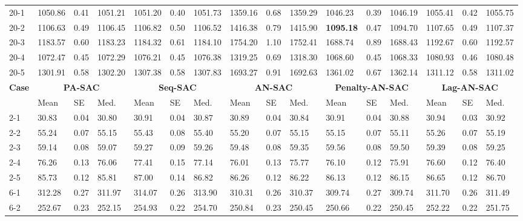 \begin{table}[!htbp]
{\begin{tabular}{l *{5}{lll}}
20-1 & 1050.86 & 0.41 & 1051.21 & 1051.20 & 0.40 & 1051.73 & 1359.16 & 0.68 & 1359.29 & 1046.23 & 0.39 & 1046.19 & 1055.41 & 0.42 & 1055.75 \\
20-2 & 1106.63 & 0.49 & 1106.45 & 1106.82 & 0.50 & 1106.52 & 1416.38 & 0.79 & 1415.90 & \textbf{1095.18} & 0.47 & 1094.70 & 1107.65 & 0.49 & 1107.37 \\
20-3 & 1183.57 & 0.60 & 1183.23 & 1184.32 & 0.61 & 1184.10 & 1754.20 & 1.10 & 1752.41 & 1688.74 & 0.89 & 1688.43 & 1192.67 & 0.60 & 1192.57 \\
20-4 & 1072.47 & 0.45 & 1072.29 & 1076.21 & 0.45 & 1076.38 & 1319.25 & 0.69 & 1318.30 & 1068.60 & 0.45 & 1068.33 & 1080.93 & 0.46 & 1080.48 \\
20-5 & 1301.91 & 0.58 & 1302.20 & 1307.38 & 0.58 & 1307.83 & 1693.27 & 0.91 & 1692.63 & 1361.02 & 0.67 & 1362.14 & 1311.12 & 0.58 & 1311.02 \\
\midrule
\multirow{2}{*}{\textbf{Case}}
& \multicolumn{3}{c}{\textbf{PA-SAC}}
& \multicolumn{3}{c}{\textbf{Seq-SAC}}
& \multicolumn{3}{c}{\textbf{AN-SAC}}
& \multicolumn{3}{c}{\textbf{Penalty-AN-SAC}}
& \multicolumn{3}{c}{\textbf{Lag-AN-SAC}}
\\
\cmidrule(lr){2-4}\cmidrule(lr){5-7}\cmidrule(lr){8-10}\cmidrule(lr){11-13}\cmidrule(lr){14-16}
 & Mean & SE & Med. & Mean & SE & Med. & Mean & SE & Med. & Mean & SE & Med. & Mean & SE & Med.\\
\midrule
2-1 & 30.83 & 0.04 & 30.80 & 30.91 & 0.04 & 30.87 & 30.89 & 0.04 & 30.84 & 30.91 & 0.04 & 30.88 & 30.94 & 0.03 & 30.92 \\
2-2 & 55.24 & 0.07 & 55.15 & 55.43 & 0.08 & 55.40 & 55.20 & 0.07 & 55.15 & 55.15 & 0.07 & 55.11 & 55.26 & 0.07 & 55.19 \\
2-3 & 59.14 & 0.08 & 59.07 & 59.27 & 0.09 & 59.26 & 59.48 & 0.08 & 59.35 & 59.56 & 0.08 & 59.50 & 59.39 & 0.08 & 59.25 \\
2-4 & 76.26 & 0.13 & 76.06 & 77.41 & 0.15 & 77.14 & 76.01 & 0.13 & 75.77 & 76.10 & 0.12 & 75.91 & 76.60 & 0.12 & 76.40 \\
2-5 & 85.73 & 0.12 & 85.81 & 87.00 & 0.14 & 86.82 & 86.26 & 0.12 & 86.22 & 86.13 & 0.12 & 86.15 & 86.65 & 0.12 & 86.70 \\
6-1 & 312.28 & 0.27 & 311.97 & 314.07 & 0.26 & 313.90 & 310.31 & 0.26 & 310.37 & 309.74 & 0.27 & 309.74 & 311.70 & 0.26 & 311.49 \\
6-2 & 252.67 & 0.23 & 252.15 & 254.93 & 0.22 & 254.70 & 250.84 & 0.23 & 250.45 & 250.66 & 0.22 & 250.45 & 252.22 & 0.22 & 251.75 \\

\end{tabular}}
\end{table}
